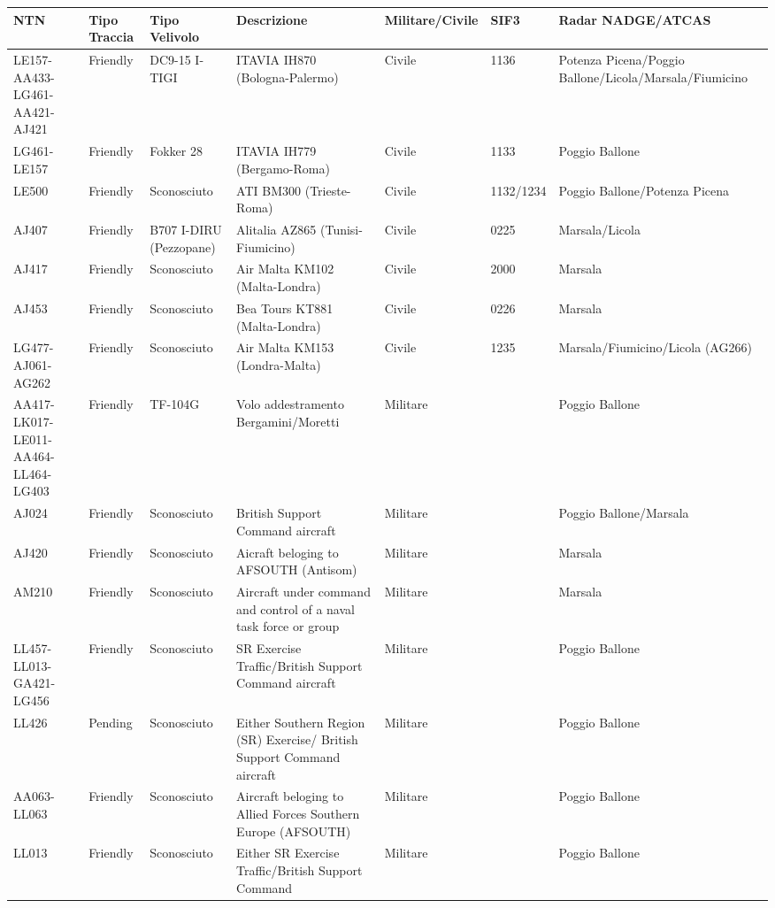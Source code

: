 \documentclass[
]{article}
\author{}
\date{}
\begin{document}
\begin{longtable}[]{@{}lllllll@{}}
\toprule
NTN & Tipo Traccia & Tipo Velivolo & Descrizione & Militare/Civile &
SIF3 & Radar NADGE/ATCAS \\
\midrule
\endhead
LE157-AA433-LG461-AA421-AJ421 & Friendly & DC9-15 I-TIGI & ITAVIA IH870
(Bologna-Palermo) & Civile & 1136 & Potenza Picena/Poggio
Ballone/Licola/Marsala/Fiumicino \\
LG461-LE157 & Friendly & Fokker 28 & ITAVIA IH779 (Bergamo-Roma) &
Civile & 1133 & Poggio Ballone \\
LE500 & Friendly & Sconosciuto & ATI BM300 (Trieste-Roma) & Civile &
1132/1234 & Poggio Ballone/Potenza Picena \\
AJ407 & Friendly & B707 I-DIRU (Pezzopane) & Alitalia AZ865
(Tunisi-Fiumicino) & Civile & 0225 & Marsala/Licola \\
AJ417 & Friendly & Sconosciuto & Air Malta KM102 (Malta-Londra) & Civile
& 2000 & Marsala \\
AJ453 & Friendly & Sconosciuto & Bea Tours KT881 (Malta-Londra) & Civile
& 0226 & Marsala \\
LG477-AJ061-AG262 & Friendly & Sconosciuto & Air Malta KM153
(Londra-Malta) & Civile & 1235 & Marsala/Fiumicino/Licola (AG266) \\
AA417-LK017-LE011-AA464-LL464-LG403 & Friendly & TF-104G & Volo
addestramento Bergamini/Moretti & Militare & & Poggio Ballone \\
AJ024 & Friendly & Sconosciuto & British Support Command aircraft &
Militare & & Poggio Ballone/Marsala \\
AJ420 & Friendly & Sconosciuto & Aicraft beloging to AFSOUTH (Antisom) &
Militare & & Marsala \\
AM210 & Friendly & Sconosciuto & Aircraft under command and control of a
naval task force or group & Militare & & Marsala \\
LL457-LL013-GA421-LG456 & Friendly & Sconosciuto & SR Exercise
Traffic/British Support Command aircraft & Militare & & Poggio
Ballone \\
LL426 & Pending & Sconosciuto & Either Southern Region (SR) Exercise/
British Support Command aircraft & Militare & & Poggio Ballone \\
AA063-LL063 & Friendly & Sconosciuto & Aircraft beloging to Allied
Forces Southern Europe (AFSOUTH) & Militare & & Poggio Ballone \\
LL013 & Friendly & Sconosciuto & Either SR Exercise Traffic/British
Support Command & Militare & & Poggio Ballone \\

\end{longtable}
\end{document}
